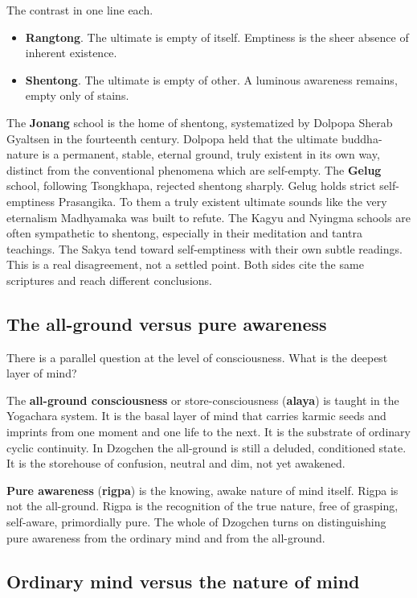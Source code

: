 The contrast in one line each.

\begin{itemize}
 \item \textbf{Rangtong}. The ultimate is empty of itself. Emptiness is the sheer absence of inherent existence.
 \item \textbf{Shentong}. The ultimate is empty of other. A luminous awareness remains, empty only of stains.
\end{itemize}

The \textbf{Jonang} school is the home of shentong, systematized by Dolpopa Sherab Gyaltsen in the fourteenth century. Dolpopa held that the ultimate buddha-nature is a permanent, stable, eternal ground, truly existent in its own way, distinct from the conventional phenomena which are self-empty. The \textbf{Gelug} school, following Tsongkhapa, rejected shentong sharply. Gelug holds strict self-emptiness Prasangika. To them a truly existent ultimate sounds like the very eternalism Madhyamaka was built to refute. The Kagyu and Nyingma schools are often sympathetic to shentong, especially in their meditation and tantra teachings. The Sakya tend toward self-emptiness with their own subtle readings. This is a real disagreement, not a settled point. Both sides cite the same scriptures and reach different conclusions.

\subsection*{The all-ground versus pure awareness}

There is a parallel question at the level of consciousness. What is the deepest layer of mind?

The \textbf{all-ground consciousness} or store-consciousness (\textbf{alaya}) is taught in the Yogachara system. It is the basal layer of mind that carries karmic seeds and imprints from one moment and one life to the next. It is the substrate of ordinary cyclic continuity. In Dzogchen the all-ground is still a deluded, conditioned state. It is the storehouse of confusion, neutral and dim, not yet awakened.

\textbf{Pure awareness} (\textbf{rigpa}) is the knowing, awake nature of mind itself. Rigpa is not the all-ground. Rigpa is the recognition of the true nature, free of grasping, self-aware, primordially pure. The whole of Dzogchen turns on distinguishing pure awareness from the ordinary mind and from the all-ground.

\subsection*{Ordinary mind versus the nature of mind}

